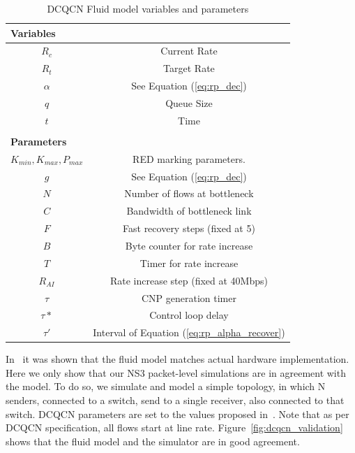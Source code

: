 \begin{table}[t]
\center
{
\footnotesize
{
\begin{tabular}{|c|c|}
\multicolumn{2}{l}{\bf Variables} \\ \hline
$R_c$ & Current Rate \\ \hline
$R_t$ & Target Rate \\ \hline
$\alpha$ & See Equation (\ref{eq:rp_dec}) \\ \hline
$q$ & Queue Size \\ \hline
$t$ & Time \\ \hline
\multicolumn{2}{c}{} \vspace{-1em} \\
\multicolumn{2}{l}{\bf Parameters} \\ \hline
$K_{min}, K_{max}, P_{max}$ & RED marking parameters. \\ \hline
$g$ & See Equation (\ref{eq:rp_dec}) \\ \hline
$N$ & Number of flows at bottleneck\\ \hline
$C$ & Bandwidth of bottleneck link\\ \hline
$F$ & Fast recovery steps (fixed at 5) \\ \hline
$B$ & Byte counter for rate increase\\ \hline
$T$ & Timer for rate increase\\ \hline
$R_{AI}$ & Rate increase step (fixed at 40Mbps)\\ \hline
$\tau$ & CNP generation timer \\ \hline
$\tau *$ & Control loop delay \\ \hline
$\tau '$ & Interval of Equation (\ref{eq:rp_alpha_recover})\\ \hline
\end{tabular}
}
}
\vspace{-0.5em}
\caption{DCQCN Fluid model variables and parameters}
\label{tab:dcqcn_varparam}
\end{table}

In~\cite{dcqcn} it was shown that the fluid model matches actual hardware
implementation. Here we only show that our NS3 packet-level
simulations are in agreement with the model.  To do so, we simulate and model a
simple topology, in which N senders, connected to a switch, send to a single
receiver, also connected to that switch. DCQCN parameters are set to the values
proposed in~\cite{dcqcn}. Note that as per DCQCN specification, all flows start
at line rate. Figure~\ref{fig:dcqcn_validation} shows that the fluid model
and the simulator are in good agreement.

